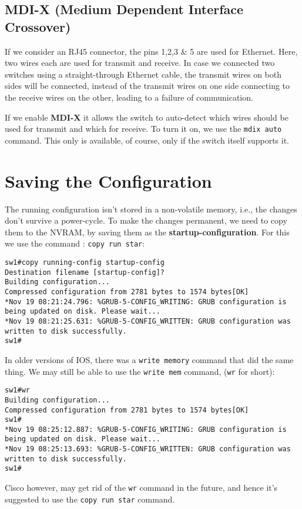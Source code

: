 \subsection{MDI-X (Medium Dependent Interface Crossover)}
If we consider an RJ45 connector, the pins 1,2,3 \& 5 are used for Ethernet. Here, two wires each are used for transmit and receive. In case we connected two switches using a straight-through Ethernet cable, the transmit wires on both sides will be connected, instead of the transmit wires on one side connecting to the receive wires on the other, leading to a failure of communication. 

If we enable \textbf{MDI-X} it allows the switch to auto-detect which wires should be used for transmit and which for receive. To turn it on, we use the \verb|mdix auto| command. This only is available, of course, only if the switch itself supports it. 

\section{Saving the Configuration}
The running configuration isn't stored in a non-volatile memory, i.e., the changes don't survive a power-cycle. To make the changes permanent, we need to copy them to the NVRAM, by saving them as the \textbf{startup-configuration}. For this we use the command : \verb|copy run star|:

\vspace{-15pt}
\begin{verbatim}
sw1#copy running-config startup-config
Destination filename [startup-config]?
Building configuration...
Compressed configuration from 2781 bytes to 1574 bytes[OK]
*Nov 19 08:21:24.796: %GRUB-5-CONFIG_WRITING: GRUB configuration is being updated on disk. Please wait...
*Nov 19 08:21:25.631: %GRUB-5-CONFIG_WRITTEN: GRUB configuration was written to disk successfully.
sw1#
\end{verbatim}
\vspace{-10pt}

\noindent
In older versions of IOS, there was a \verb|write memory| command that did the same thing. We may still be able to use the \verb|write mem| command, (\verb|wr| for short):

\vspace{-15pt}
\begin{verbatim}
sw1#wr
Building configuration...
Compressed configuration from 2781 bytes to 1574 bytes[OK]
sw1#
*Nov 19 08:25:12.887: %GRUB-5-CONFIG_WRITING: GRUB configuration is being updated on disk. Please wait...
*Nov 19 08:25:13.693: %GRUB-5-CONFIG_WRITTEN: GRUB configuration was written to disk successfully.
sw1#
\end{verbatim}
\vspace{-10pt}

\noindent
Cisco however, may get rid of the \verb|wr| command in the future, and hence it's suggested to use the \verb|copy run star| command.